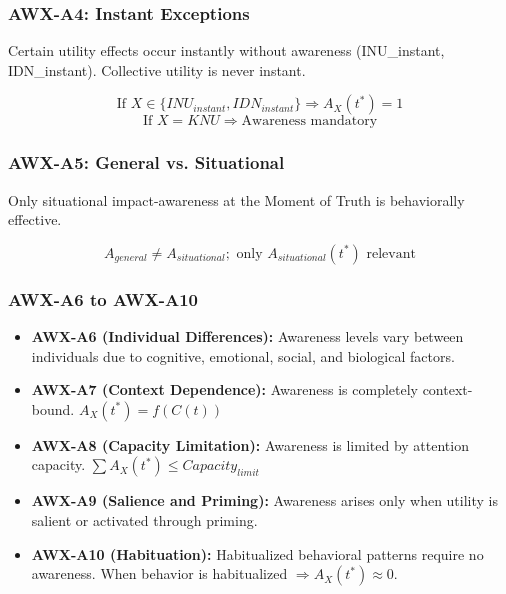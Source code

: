 \subsubsection{AWX-A4: Instant Exceptions}

\begin{axiom}
\label{ax:awx-a4}
Certain utility effects occur instantly without awareness (INU\_instant, IDN\_instant).
Collective utility is never instant.
\end{axiom}

\begin{equation}
\text{If } X \in \{INU_{instant}, IDN_{instant}\} \Rightarrow A_X(t^*) = 1
\end{equation}
\begin{equation}
\text{If } X = KNU \Rightarrow \text{Awareness mandatory}
\end{equation}

\subsubsection{AWX-A5: General vs. Situational}

\begin{axiom}
\label{ax:awx-a5}
Only situational impact-awareness at the Moment of Truth is behaviorally effective.
\end{axiom}

\begin{equation}
A_{general} \neq A_{situational}; \text{ only } A_{situational}(t^*) \text{ relevant}
\end{equation}

\subsubsection{AWX-A6 to AWX-A10}

\begin{itemize}
\item \textbf{AWX-A6 (Individual Differences):} Awareness levels vary between 
individuals due to cognitive, emotional, social, and biological factors.

\item \textbf{AWX-A7 (Context Dependence):} Awareness is completely context-bound.
$A_X(t^*) = f(C(t))$

\item \textbf{AWX-A8 (Capacity Limitation):} Awareness is limited by attention capacity.
$\sum A_X(t^*) \leq Capacity_{limit}$

\item \textbf{AWX-A9 (Salience and Priming):} Awareness arises only when utility 
is salient or activated through priming.

\item \textbf{AWX-A10 (Habituation):} Habitualized behavioral patterns require 
no awareness. When behavior is habitualized $\Rightarrow A_X(t^*) \approx 0$.
\end{itemize}

